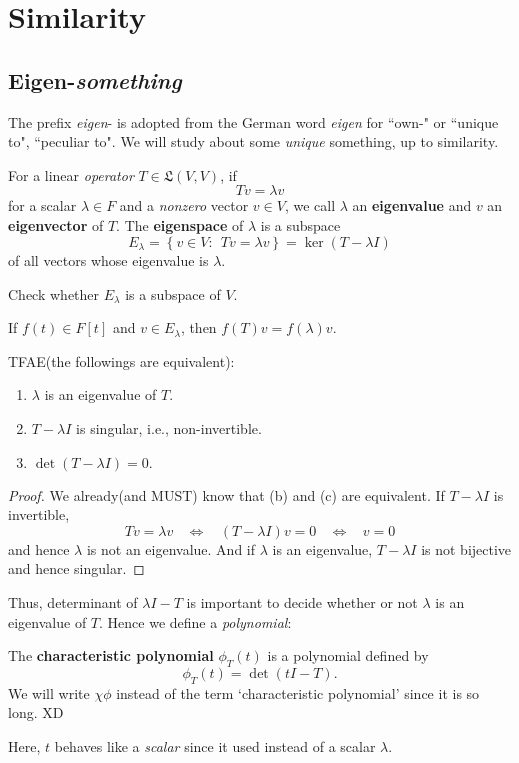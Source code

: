 \chapter{Similarity}
\section{Eigen-\textit{something}}
The prefix \textit{eigen}- is adopted from the German word \textit{eigen} for ``own-" or ``unique to", ``peculiar to". We will study about some \textit{unique} something, up to similarity.

\begin{defn} For a linear \textit{operator} $T \in \mathfrak L(V,V)$, if $$Tv = \lambda v$$ for a scalar $\lambda\in F$ and a \textit{nonzero} vector $v\in V$, we call $\lambda$ an \textbf{eigenvalue} and $v$ an \textbf{eigenvector} of $T$. The \textbf{eigenspace} of $\lambda$ is a subspace $$E_\lambda = \left \{v\in V: ~~ Tv= \lambda v\right\} = \ker(T-\lambda I)$$ of all vectors whose eigenvalue is $\lambda$.
\end{defn}
\begin{ex}
Check whether $E_\lambda$ is a subspace of $V$.
\end{ex}
\begin{prop}
If $f(t) \in F[t]$ and $v\in E_\lambda$, then $f(T)v = f(\lambda)v.$
\end{prop}
\begin{theorem}
TFAE(the followings are equivalent):
\begin{enumerate}[label={(\alph*)}]
    \item $\lambda$ is an eigenvalue of $T$.
    \item $T-\lambda I$ is singular, i.e., non-invertible.
    \item $\operatorname{det} (T-\lambda I) = 0.$
\end{enumerate}
\end{theorem}
\begin{proof}
We already(and MUST) know that (b) and (c) are equivalent. If $T-\lambda I$ is invertible, $$Tv = \lambda v ~~~~\Longleftrightarrow~~~~ (T-\lambda I)v = 0~~~~\Longleftrightarrow~~~~v=0$$and hence $\lambda$ is not an eigenvalue. And if $\lambda$ is an eigenvalue, $T-\lambda I$ is not bijective and hence singular.
\end{proof}
Thus, determinant of $\lambda I - T$ is important to decide whether or not $\lambda$ is an eigenvalue of $T$. Hence we define a \textit{polynomial}:
\begin{defn} The \textbf{characteristic polynomial} $\phi_T(t)$ is a polynomial defined by $$\phi_T(t) = \operatorname{det} (tI-T).$$ We will write $\chi\phi$ instead of the term `characteristic polynomial' since it is so long. \textsf{XD}

Here, $t$ behaves like a \textit{scalar} since it used instead of a scalar $\lambda$.
\end{defn}
